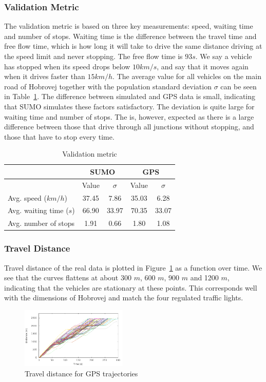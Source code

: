 \subsubsection{Validation Metric}
The validation metric is based on three key measurements: speed, waiting time and number of stops. 
Waiting time is the difference between the travel time and free flow time, which is how long it will take to drive the same distance driving at the speed limit and never stopping.
The free flow time is $93s$.
We say a vehicle has stopped when its speed drops below $10km/s$, and say that it moves again when it drives faster than $15km/h$.
The average value for all vehicles on the main road of Hobrovej together with the population standard deviation $\sigma$ can be seen in Table~\ref{table.valMetric}.
The difference between simulated and GPS data is small, indicating that SUMO simulates these factors satisfactory.
The deviation is quite large for waiting time and number of stops.
The is, however, expected as there is a large difference between those that drive through all junctions without stopping, and those that have to stop every time.
\begin{table}
\centering
\begin{tabular}{|l|c|c|c|c|}\hline
 						&  \multicolumn{2}{c|}{SUMO} & \multicolumn{2}{c|}{GPS} \\\hline
 						& Value & $\sigma$ & Value & $\sigma$ \\\hline
Avg. speed ($km/h$) 	& 37.45 & 7.86 	& 35.03 & 6.28 \\\hline
Avg. waiting time ($s$) & 66.90 & 33.97 & 70.35 & 33.07 \\\hline
Avg. number of stops 	& 1.91 	& 0.66 	& 1.80 	& 1.08 \\\hline
\end{tabular}
\caption{Validation metric}\label{table.valMetric}
\end{table}

\subsubsection{Travel Distance}
Travel distance of the real data is plotted in Figure~\ref{fig:TestResults:realDistance} as a function over time. 
We see that the curves flattens at about 300 $m$, 600 $m$, 900 $m$ and 1200 $m$, indicating that the vehicles are stationary at these points.
This corresponds well with the dimensions of Hobrovej and match the four regulated traffic lights.
\begin{figure}[htb]
\includegraphics[width=0.45\textwidth]{../images/Real/RealDistance.png}
\caption{Travel distance for GPS trajectories}
\label{fig:TestResults:realDistance}
\end{figure}

